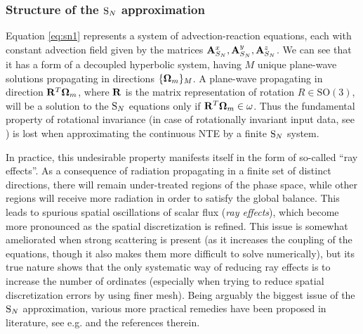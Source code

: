 \subsubsection{Structure of the $\text{S}_{N}$ approximation}
Equation \eqref{eq:sn1} represents a system of advection-reaction equations, each with constant advection field given by
the matrices $\mathbf{A}_{S_N}^x, \mathbf{A}_{S_N}^y, \mathbf{A}_{S_N}^z$. We can see that it has a form of a decoupled
hyperbolic system, having $M$ unique plane-wave solutions propagating in directions $\{\mathbf{\Omega}_m\}_{M}$. A
plane-wave propagating in direction $\mathbf{R}^T\mathbf{\Omega}_m$, where $\mathbf{R}$ is the matrix representation of rotation
$R\in \mathrm{SO}(3)$, will be a solution to the $\text{S}_{N}$ equations only if $\mathbf{R}^T\mathbf{\Omega}_m \in \omega$. Thus the
fundamental property of rotational invariance (in case of rotationally invariant input data, see
) is lost when approximating the continuous NTE by a finite $\text{S}_{N}$ system. 

In practice, this undesirable property manifests itself in the form of so-called ``ray effects''. As a consequence of
radiation propagating in a finite set of distinct directions, there will remain under-treated regions of the phase
space, while other regions will receive more radiation in order to satisfy the global balance. This leads to spurious spatial oscillations
of scalar flux (\textit{ray effects}), which become more pronounced as the spatial discretization is refined.
This issue is somewhat ameliorated when strong scattering is present (as it increases the coupling of the equations,
though it also makes them more difficult to solve numerically), but its true nature shows that the only systematic way
of reducing ray effects is to increase the number of ordinates (especially when trying to reduce spatial discretization
errors by using finer mesh). Being arguably the biggest issue of the $\text{S}_{N}$ approximation, various more practical
remedies have been proposed in literature, see e.g. \cite{Li1} and the references therein. 

